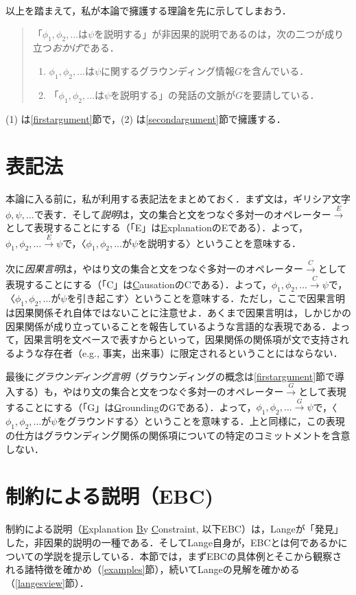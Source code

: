 \documentclass[dvipdfmx,twoside,11pt,uplatex]{jsarticle}
\theoremstyle{definition}
\begin{document}
以上を踏まえて，私が本論で擁護する理論を先に示してしまおう．
\begin{quote}
「$\phi_1, \phi_2, \ldots$は$\psi$を説明する」が非因果的説明であるのは，次の二つが成り立つ\emph{おかげ}である．
	\begin{enumerate}
	\item $\phi_1, \phi_2, \ldots$は$\psi$に関するグラウンディング情報$G$を含んでいる．	
	\item 「$\phi_1, \phi_2, \ldots$は$\psi$を説明する」の発話の文脈が$G$を要請している．
	\end{enumerate}
\end{quote}

\noindent(1) は\ref{firstargument}節で，(2) は\ref{secondargument}節で擁護する．

\section{表記法}
本論に入る前に，私が利用する表記法をまとめておく．まず文は，ギリシア文字$\phi, \psi, \ldots$で表す．そして\emph{説明}は，文の集合と文をつなぐ多対一のオペレーター$\xrightarrow{E}$として表現することにする（「E」は\underline{E}xplanationのEである）．よって，$\phi_1, \phi_2, \ldots\xrightarrow{E}\psi$で，〈$\phi_1, \phi_2, \ldots$が$\psi$を説明する〉ということを意味する．

次に\emph{因果言明}は，やはり文の集合と文をつなぐ多対一のオペレーター$\xrightarrow{C}$として表現することにする（「C」は\underline{C}ausationのCである）．よって，$\phi_1, \phi_2, \ldots\xrightarrow{C}\psi$で，〈$\phi_1, \phi_2, \ldots$が$\psi$を引き起こす〉ということを意味する．ただし，ここで因果言明は因果関係それ自体ではないことに注意せよ．あくまで因果言明は，しかじかの因果関係が成り立っていることを報告しているような言語的な表現である．よって，因果言明を文ベースで表すからといって，因果関係の関係項が文で支持されるような存在者（e.g., 事実，出来事）に限定されるということにはならない．

最後に\emph{グラウンディング言明}（グラウンディングの概念は\ref{firstargument}節で導入する）も，やはり文の集合と文をつなぐ多対一のオペレーター$\xrightarrow{G}$として表現することにする（「G」は\underline{G}roundingのGである）．よって，$\phi_1, \phi_2, \ldots\xrightarrow{G}\psi$で，〈$\phi_1, \phi_2, \ldots$が$\psi$をグラウンドする〉ということを意味する．上と同様に，この表現の仕方はグラウンディング関係の関係項についての特定のコミットメントを含意しない．

\section{制約による説明（EBC)}\label{explanationbyconstraint}
制約による説明（\underline{E}xplanation \underline{B}y \underline{C}onstraint, 以下EBC）は，Langeが「発見」した，非因果的説明の一種である．そしてLange自身が，EBCとは何であるかについての学説を提示している．本節では，まずEBCの具体例とそこから観察される諸特徴を確かめ（\ref{examples}節），続いてLangeの見解を確かめる（\ref{langesview}節）．
\end{document}

